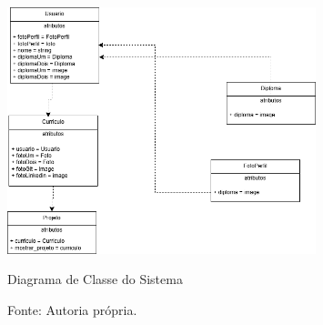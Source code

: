 \begin{figure}[h!]
\centering
\includegraphics[width=0.8\textwidth]{Figures/diagrama_classe.drawio.png}
\caption{Diagrama de Classe do Sistema}
\caption*{Fonte: Autoria própria.}
\label{fig:diagrama_classe}
\end{figure}